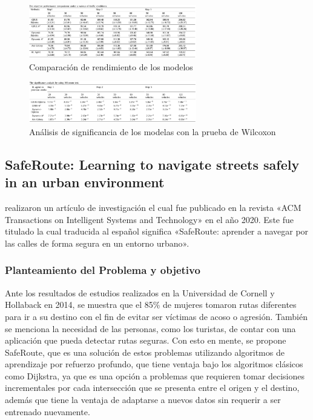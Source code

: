 \begin{figure}[h]
	\begin{center}
		\includegraphics[width=0.65\textwidth]{2/figures/ResultSumo.jpg}
		\caption{Comparación de rendimiento de los modelos}
		\label{1:fig2}
	\end{center}
\end{figure}


 \begin{figure}[h]
	\begin{center}
		\includegraphics[width=0.65\textwidth]{2/figures/Result2Sumo.jpg}
		\caption{Análisis de significancia de los modelas con la prueba de Wilcoxon}
		\label{1:fig2}
	\end{center}
\end{figure}

\subsection{SafeRoute: Learning to navigate streets safely in an urban environment \citep*{pr_dehghani2018copper}}
\citeauthor{pr_dehghani2018copper} realizaron un artículo de investigación el cual fue publicado en la revista «ACM Transactions on Intelligent Systems and Technology» en el año 2020. Este fue titulado  la cual traducida al español significa «SafeRoute: aprender a navegar por las calles de forma segura en un entorno urbano».

\subsubsection{Planteamiento del Problema y objetivo }
Ante los resultados de estudios realizados en la Universidad de Cornell y Hollaback en 2014, se muestra que el 85\% de mujeres tomaron rutas diferentes para ir a su destino con el fin de evitar ser víctimas de acoso o agresión. También se menciona la necesidad de las personas, como los turistas, de contar con una aplicación que pueda detectar rutas seguras. Con esto en mente, se propone SafeRoute, que es una solución de estos problemas utilizando algoritmos de aprendizaje por refuerzo profundo, que tiene ventaja bajo los algoritmos clásicos como Dijkstra, ya que es una opción a problemas que requieren tomar decisiones incrementales por cada intersección que se presenta entre el origen y el destino, además que tiene la ventaja de adaptarse a nuevos datos sin requerir a ser entrenado nuevamente.


